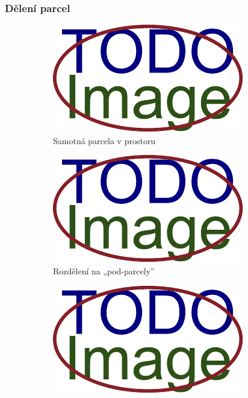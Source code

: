 \subsubsection*{Dělení parcel}\label{ch:impl:parcely:budovy:dělení}

\begin{figure}[H]
	\centering
	\begin{subfigure}{0.32\textwidth}
		\includegraphics[width=\textwidth]{obrazky-figures/placeholder.pdf}
		\caption{Samotná parcela v prostoru}
		\label{fig:parcely:budovy:dělení:samotná}
	\end{subfigure}
	\hfill
	\begin{subfigure}{0.32\textwidth}
		\includegraphics[width=\textwidth]{obrazky-figures/placeholder.pdf}
		\caption{Rozdělení na „pod-parcely”}
		\label{fig:parcely:budovy:dělení:subparcely}
	\end{subfigure}
	\hfill
	\begin{subfigure}{0.32\textwidth}
		\includegraphics[width=\textwidth]{obrazky-figures/placeholder.pdf}

\end{subfigure}
\end{figure}

